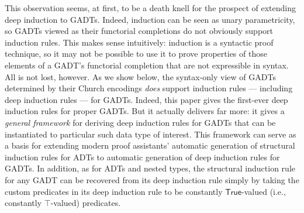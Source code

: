 \documentclass[9pt]{entcs}
\begin{document}
This observation seems, at first, to be a death knell for the prospect
of extending deep induction to GADTs. Indeed, induction can be seen as
unary parametricity, so GADTs viewed as their functorial completions
do not obviously support induction rules.  This makes sense
intuitively: induction is a syntactic proof technique, so it may not
be possible to use it to prove properties of those elements of a
GADT's functorial completion that are not expressible in syntax. All
is not lost, however. As we show below, the syntax-only view of GADTs
determined by their Church encodings {\em does} support induction
rules --- including deep induction rules --- for GADTs. Indeed, this
paper gives the first-ever deep induction rules
for proper GADTs.
But it actually delivers far more: it gives a {\em general framework}
for deriving deep induction rules for GADTs that can be instantiated
to particular such data type of interest. This framework can serve as
a basis for extending modern proof assistants' automatic generation of
structural induction rules for ADTs to automatic generation of deep
induction rules for GADTs. In addition, as for ADTs and nested types,
the structural induction rule for any GADT can be recovered from its
deep induction rule simply by taking the custom predicates in its deep
induction rule to be constantly $\mathsf{True}$-valued (i.e.,
constantly $\mathsf{\top}$-valued) predicates.
\end{document}
